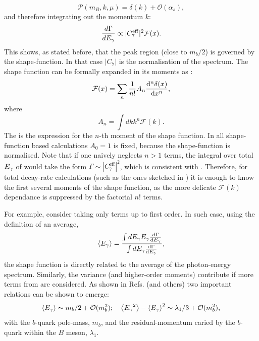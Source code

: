 \begin{equation}
    \mathcal{P}(m_B,k,\mu) = \delta(k) + \mathcal{O}(\alpha_s),
\end{equation}
and therefore integrating out the momentum $k$:
\begin{equation}\label{eq:integrated_egamma}
    \frac{d\Gamma}{d{E_{\gamma}}} \propto |C_7^{\mathrm{eff}}|^2 \mathcal{F}(x).
\end{equation}
This shows, as stated before, that the peak region (close to $m_b/2$) is governed by the shape-function.
In that case $|C_7|$ is the normalisation of the spectrum.
The shape function can be formally expanded in its moments as \cite{PhysRevD.50.2037,Ligeti:2008ac}:
\begin{equation}\label{eq:shape_function_expansion}
    \mathcal{F}(x) = \sum_n \frac{1}{n!} A_n \dv[n]{\delta(x)}{x},
\end{equation}
where 
\begin{equation}\label{eq:moments_of_shape_function}
    A_n = \int dk k^n \mathcal{F}(k).
\end{equation}
The  is the expression for the $n$-th moment of the shape function.
In all shape-function based calculations $A_0=1$ is fixed, because the shape-function is normalised.
Note that if one naively neglects $n>1$ terms, the integral over total ${E_{\gamma}}$ of  would take the form $\Gamma\sim|C_7^{\mathrm{eff}}|^2$, which is consistent with .
Therefore, for total decay-rate calculations (such as the ones sketched in ) it is enough to know the first several moments of the shape function, as the more delicate $\mathcal{F}(k)$ dependance is suppressed by the factorial $n!$ terms.

For example, consider taking only terms up to first order.
In such case, using the definition of an average,
\begin{equation}
    \expval{{\ensuremath{E_{\gamma}}}} = \frac{\int d{E_{\gamma}} {E_{\gamma}} \dv{\Gamma}{{\ensuremath{E_{\gamma}}}}}{\int d{E_{\gamma}} \dv{\Gamma}{{\ensuremath{E_{\gamma}}}}},
\end{equation}
the shape function is directly related to the average of the photon-energy spectrum.
Similarly, the variance (and higher-order moments) contribute if more terms from  are considered.
As shown in Refs.\cite{Bauer:1997fe,Kapustin:1995fk} (and others) two important relations can be shown to emerge:
\begin{equation}
    \expval{\Egamma} \sim m_b/2+\order(m_b^2); \quad \expval{\Egamma^2}-\expval{\Egamma}^2 \sim \lambda_1/3+\order(m_b^2),
\end{equation}
with the $b$-quark pole-mass, $m_b$, and the residual-momentum caried by the $b$-quark within the $B$ meson, $\lambda_1$.

